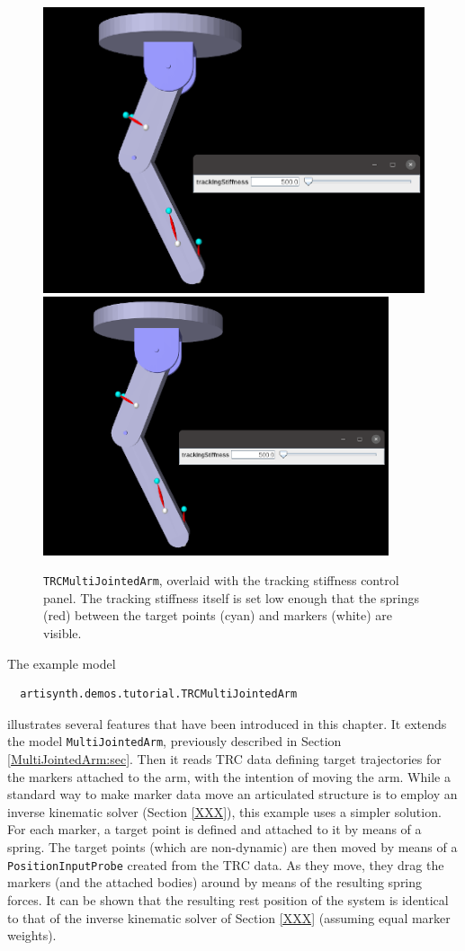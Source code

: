 \begin{figure}[t]
\begin{center}
\iflatexml
 \includegraphics[]{images/TRCMultiJointedArm}
\else
 \includegraphics[width=4in]{images/TRCMultiJointedArm}
\fi
\end{center}
\caption{{\tt TRCMultiJointedArm}, overlaid with the tracking stiffness
control panel. The tracking stiffness itself is set low enough that
the springs (red) between the target points (cyan) and markers (white)
are visible.}
\label{TRCMultiJointedArm:fig}
\end{figure}

The example model
%
\begin{verbatim}
  artisynth.demos.tutorial.TRCMultiJointedArm
\end{verbatim}
%
illustrates several features that have been introduced in this chapter.  It
extends the model {\tt MultiJointedArm}, previously described in
Section \ref{MultiJointedArm:sec}. Then it reads TRC data defining target
trajectories for the markers attached to the arm, with the intention of moving
the arm. While a standard way to make marker data move an articulated structure
is to employ an inverse kinematic solver (Section \ref{XXX}), this example
uses a simpler solution. For each marker, a target point is defined and
attached to it by means of a spring. The target points (which are non-dynamic)
are then moved by means of a {\tt PositionInputProbe} created from the TRC
data. As they move, they drag the markers (and the attached bodies) around by
means of the resulting spring forces. It can be shown that the resulting rest
position of the system is identical to that of the inverse kinematic solver of
Section \ref{XXX} (assuming equal marker weights).

